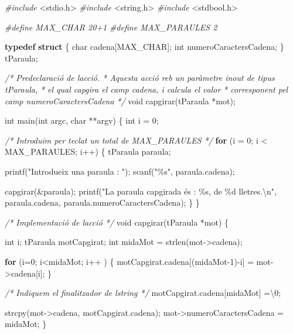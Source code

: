 \documentclass[]{book}
\newenvironment{Shaded}{\begin{snugshade}}{\end{snugshade}}
\newcommand{\CharTok}[1]{\textcolor[rgb]{0.31,0.60,0.02}{#1}}
\newcommand{\CommentTok}[1]{\textcolor[rgb]{0.56,0.35,0.01}{\textit{#1}}}
\newcommand{\ControlFlowTok}[1]{\textcolor[rgb]{0.13,0.29,0.53}{\textbf{#1}}}
\newcommand{\DataTypeTok}[1]{\textcolor[rgb]{0.13,0.29,0.53}{#1}}
\newcommand{\DecValTok}[1]{\textcolor[rgb]{0.00,0.00,0.81}{#1}}
\newcommand{\ImportTok}[1]{#1}
\newcommand{\KeywordTok}[1]{\textcolor[rgb]{0.13,0.29,0.53}{\textbf{#1}}}
\newcommand{\NormalTok}[1]{#1}
\newcommand{\PreprocessorTok}[1]{\textcolor[rgb]{0.56,0.35,0.01}{\textit{#1}}}
\newcommand{\SpecialCharTok}[1]{\textcolor[rgb]{0.00,0.00,0.00}{#1}}
\newcommand{\StringTok}[1]{\textcolor[rgb]{0.31,0.60,0.02}{#1}}
\begin{document}
\begin{Shaded}
\begin{Highlighting}[]
\PreprocessorTok{\#include }\ImportTok{\textless{}stdio.h\textgreater{}}
\PreprocessorTok{\#include }\ImportTok{\textless{}string.h\textgreater{}}
\PreprocessorTok{\#include }\ImportTok{\textless{}stdbool.h\textgreater{}}

\PreprocessorTok{\#define MAX\_CHAR 20+1}
\PreprocessorTok{\#define MAX\_PARAULES 2}

\KeywordTok{typedef} \KeywordTok{struct}\NormalTok{ \{}
    \DataTypeTok{char}\NormalTok{ cadena[MAX\_CHAR];}
    \DataTypeTok{int}\NormalTok{ numeroCaractersCadena;}
\NormalTok{\} tParaula;}

\CommentTok{/* Predeclaració de l\textquotesingle{}acció.}
\CommentTok{ * Aquesta acció reb un paràmetre inout de tipus tParaula,}
\CommentTok{ * el qual capgira el camp cadena, i calcula el valor}
\CommentTok{ * corresponent pel camp numeroCaractersCadena }
\CommentTok{ */}
\DataTypeTok{void}\NormalTok{ capgirar(tParaula *mot);}

\DataTypeTok{int}\NormalTok{ main(}\DataTypeTok{int}\NormalTok{ argc, }\DataTypeTok{char}\NormalTok{ **argv) \{}
    \DataTypeTok{int}\NormalTok{ i = }\DecValTok{0}\NormalTok{;}
    
    \CommentTok{/* Introduim per teclat un total de MAX\_PARAULES */}
    \ControlFlowTok{for}\NormalTok{ (i = }\DecValTok{0}\NormalTok{; i \textless{} MAX\_PARAULES; i++) \{}
\NormalTok{        tParaula paraula;}
    
\NormalTok{        printf(}\StringTok{"Introdueix una paraula : "}\NormalTok{);}
\NormalTok{        scanf(}\StringTok{"\%s"}\NormalTok{, paraula.cadena);}
    
\NormalTok{        capgirar(\&paraula);}
\NormalTok{        printf(}\StringTok{"La paraula capgirada és : \%s, de \%d lletres.}\SpecialCharTok{\textbackslash{}n}\StringTok{"}\NormalTok{, paraula.cadena, paraula.numeroCaractersCadena);}
\NormalTok{    \}}
\NormalTok{\}}

\CommentTok{/* Implementació de l\textquotesingle{}acció */}
\DataTypeTok{void}\NormalTok{ capgirar(tParaula *mot) \{}
    
    \DataTypeTok{int}\NormalTok{ i;}
\NormalTok{    tParaula motCapgirat;}
    \DataTypeTok{int}\NormalTok{ midaMot = strlen(mot{-}\textgreater{}cadena);}
 
    \ControlFlowTok{for}\NormalTok{ (i=}\DecValTok{0}\NormalTok{; i\textless{}midaMot; i++ ) \{}
\NormalTok{        motCapgirat.cadena[(midaMot{-}}\DecValTok{1}\NormalTok{){-}i] = mot{-}\textgreater{}cadena[i];}
\NormalTok{    \}}
    
    \CommentTok{/* Indiquem el finalitzador de l\textquotesingle{}string */}
\NormalTok{    motCapgirat.cadena[midaMot] =}\CharTok{\textquotesingle{}\textbackslash{}0\textquotesingle{}}\NormalTok{;}
    
\NormalTok{    strcpy(mot{-}\textgreater{}cadena, motCapgirat.cadena);}
\NormalTok{    mot{-}\textgreater{}numeroCaractersCadena = midaMot;}
\NormalTok{\}}
\end{Highlighting}
\end{Shaded}
\end{document}
